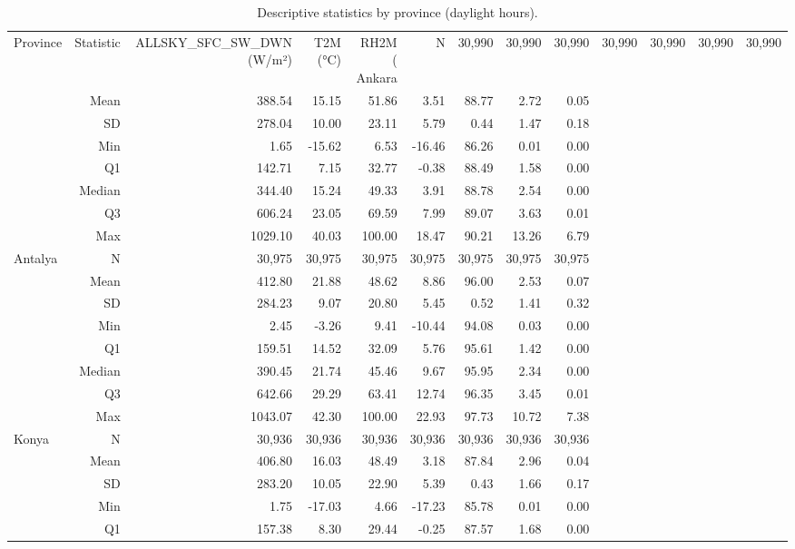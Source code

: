 \begin{table}[htbp]
\centering
\caption{Descriptive statistics by province (daylight hours).}
\label{tab:descriptive_stats_by_city_daylight}
\begin{tabular}{lrrrrrrrr}
\hline
Province & Statistic & ALLSKY\_SFC\_SW\_DWN (W/m²) & T2M (°C) & RH2M (%
\hline
Ankara & N & 30,990 & 30,990 & 30,990 & 30,990 & 30,990 & 30,990 & 30,990 \\
 & Mean & 388.54 & 15.15 & 51.86 & 3.51 & 88.77 & 2.72 & 0.05 \\
 & SD & 278.04 & 10.00 & 23.11 & 5.79 & 0.44 & 1.47 & 0.18 \\
 & Min & 1.65 & -15.62 & 6.53 & -16.46 & 86.26 & 0.01 & 0.00 \\
 & Q1 & 142.71 & 7.15 & 32.77 & -0.38 & 88.49 & 1.58 & 0.00 \\
 & Median & 344.40 & 15.24 & 49.33 & 3.91 & 88.78 & 2.54 & 0.00 \\
 & Q3 & 606.24 & 23.05 & 69.59 & 7.99 & 89.07 & 3.63 & 0.01 \\
 & Max & 1029.10 & 40.03 & 100.00 & 18.47 & 90.21 & 13.26 & 6.79 \\
Antalya & N & 30,975 & 30,975 & 30,975 & 30,975 & 30,975 & 30,975 & 30,975 \\
 & Mean & 412.80 & 21.88 & 48.62 & 8.86 & 96.00 & 2.53 & 0.07 \\
 & SD & 284.23 & 9.07 & 20.80 & 5.45 & 0.52 & 1.41 & 0.32 \\
 & Min & 2.45 & -3.26 & 9.41 & -10.44 & 94.08 & 0.03 & 0.00 \\
 & Q1 & 159.51 & 14.52 & 32.09 & 5.76 & 95.61 & 1.42 & 0.00 \\
 & Median & 390.45 & 21.74 & 45.46 & 9.67 & 95.95 & 2.34 & 0.00 \\
 & Q3 & 642.66 & 29.29 & 63.41 & 12.74 & 96.35 & 3.45 & 0.01 \\
 & Max & 1043.07 & 42.30 & 100.00 & 22.93 & 97.73 & 10.72 & 7.38 \\
Konya & N & 30,936 & 30,936 & 30,936 & 30,936 & 30,936 & 30,936 & 30,936 \\
 & Mean & 406.80 & 16.03 & 48.49 & 3.18 & 87.84 & 2.96 & 0.04 \\
 & SD & 283.20 & 10.05 & 22.90 & 5.39 & 0.43 & 1.66 & 0.17 \\
 & Min & 1.75 & -17.03 & 4.66 & -17.23 & 85.78 & 0.01 & 0.00 \\
 & Q1 & 157.38 & 8.30 & 29.44 & -0.25 & 87.57 & 1.68 & 0.00 \\

\end{tabular}
\end{table}
